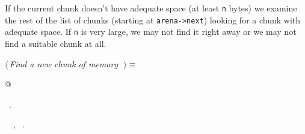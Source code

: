 \documentclass{report}
\begin{document}
If the current chunk doesn't have adequate space (at least \verb|n|
bytes) we examine the rest of the list of chunks (starting at 
\verb|arena->next|) looking for a chunk with adequate space. If \verb|n|
is very large, we may not find it right away or we may not find a
suitable chunk at all.
\begin{flushleft} \small
\begin{minipage}{\linewidth} \label{scrap259}
$\langle\,${\it Find a new chunk of memory}\nobreak\ {\footnotesize {}}$\,\rangle\equiv$
\vspace{-1ex}
\begin{list}{}{} \item
\mbox{}@{\NWsep}
\end{list}
\vspace{-1ex}
\footnotesize\addtolength{\baselineskip}{-1ex}
\begin{list}{}{\setlength{\itemsep}{-\parsep}\setlength{\itemindent}{-\leftmargin}}
\item \NWtxtMacroRefIn\ .
\end{list}
\vspace{-2ex}
\footnotesize\addtolength{\baselineskip}{-1ex}
\begin{list}{}{\setlength{\itemsep}{-\parsep}\setlength{\itemindent}{-\leftmargin}}
\item \NWtxtIdentsUsed\nobreak\  \verb@arena@\nobreak\ , \verb@Chunk@\nobreak\ .\end{list}
\end{minipage}\\[4ex]
\end{flushleft}
\end{document}
